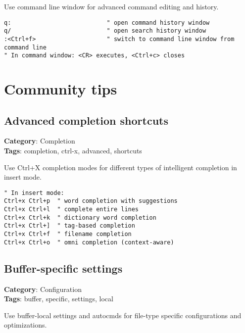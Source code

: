 {{{{Use command line window for advanced command editing and history.

\begin{Exa*}{}
\begin{Verbatim}[fontsize=\footnotesize, breaklines, breakanywhere]
q:                           " open command history window
q/                           " open search history window
:<Ctrl+f>                    " switch to command line window from command line
" In command window: <CR> executes, <Ctrl+c> closes
\end{Verbatim}
\end{Exa*}

\chapter{Community tips}
\section{Advanced completion shortcuts}

\textbf{Category}: Completion\\ \textbf{Tags}: completion, ctrl-x, advanced, shortcuts
\vspace{0.5cm}

Use Ctrl+X completion modes for different types of intelligent completion in insert mode.

\begin{Exa*}{}
\begin{Verbatim}[fontsize=\footnotesize, breaklines, breakanywhere]
" In insert mode:
Ctrl+x Ctrl+p  " word completion with suggestions
Ctrl+x Ctrl+l  " complete entire lines
Ctrl+x Ctrl+k  " dictionary word completion  
Ctrl+x Ctrl+]  " tag-based completion
Ctrl+x Ctrl+f  " filename completion
Ctrl+x Ctrl+o  " omni completion (context-aware)
\end{Verbatim}
\end{Exa*}

\section{Buffer-specific settings}

\textbf{Category}: Configuration\\ \textbf{Tags}: buffer, specific, settings, local
\vspace{0.5cm}

Use buffer-local settings and autocmds for file-type specific configurations and optimizations.

}}}}
